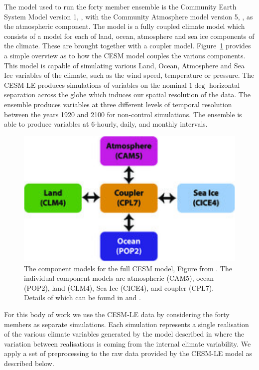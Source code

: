  The model used to run the forty member ensemble is the Community Earth System Model version 1, \citep{hurrell_community_2013}, with the Community Atmosphere model version 5, \citep{hurrell_community_2013}, as the atmospheric component.
 The model is a fully coupled climate model which consists of a model for each of land, ocean, atmosphere and sea ice components of the climate.
 These are brought together with a coupler model.
 Figure~\ref{fig:cesm} provides a simple overview as to how the CESM model couples the various components.
 This  model is capable of simulating various Land, Ocean, Atmosphere and Sea Ice variables of the climate, such as the wind speed, temperature or pressure.
 The CESM-LE produces simulations of variables on the nominal $1\deg$ horizontal separation across the globe which induces our spatial resolution of the data.
 The ensemble produces variables at three different levels of temporal resolution between the years 1920 and 2100 for non-control simulations. The ensemble is able to produce variables at 6-hourly, daily, and monthly intervals. 
 
 \begin{figure}[htbp!] 
 	\centering    
 	\includegraphics[width=1.0\textwidth]{cesm_components}
 	\caption[The components for the CESM model.]{The component models for the full CESM model, Figure from \citep{kay_community_2015}. The individual component models are atmospheric (CAM5), ocean (POP2), land (CLM4), Sea Ice (CICE4), and coupler (CPL7). Details of which can be found in \citep{kay_community_2015} and \citep{hurrell_community_2013}.}
 	\label{fig:cesm}
 \end{figure}

 For this body of work we use the CESM-LE data by considering the forty members as separate simulations.
 Each simulation represents a single realisation of the various climate variables generated by the model described in \citep{kay_community_2015} where the variation between realisations is coming from the internal climate variability. 
 We apply a set of preprocessing to the raw data provided by the CESM-LE model as described below. 
 
